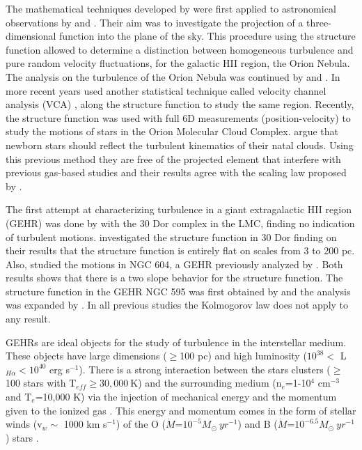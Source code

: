 \documentclass[fleqn,usenatbib]{mnras}
\begin{document}
The mathematical techniques developed by \citet{kolm1,heisenberg1951stability} were first applied to astronomical observations by \citet{von1951methode} and \citet{munch1958internal}. Their aim was to investigate the projection of a three-dimensional function into the plane of the sky. This procedure using the structure function allowed to determine a distinction between homogeneous turbulence and pure random velocity fluctuations, for the galactic HII region, the Orion Nebula. The analysis on the turbulence of the Orion Nebula was continued by \citet{castaneda1988} and \citet{1992ApJ...387..229O}. In more recent years \cite{arthur2016turbulence} used another statistical technique called velocity channel analysis (VCA) \citep{2000ApJ...537..720L}, along the structure function to study the same region. Recently, the structure function was used with full 6D measurements (position-velocity) to study the motions of stars in the Orion Molecular Cloud Complex. \cite{2021ApJ...907L..40H} argue that newborn stars should reflect the turbulent kinematics of their natal clouds. Using this previous method they are free of the projected element that interfere with previous gas-based studies and their results agree with the scaling law proposed by \cite{1981MNRAS.194..809L}.  

The first attempt at characterizing turbulence in a giant extragalactic HII region (GEHR) was done by \citet{1961MNRAS.122....1F} with the 30 Dor complex in the LMC, finding no indication of turbulent motions. \cite{2019arXiv191203543M} investigated the structure function in 30 Dor finding on their results that the structure function is entirely flat on scales from 3 to 200 pc. Also, \cite{2019arXiv191203543M} studied the motions in NGC 604, a GEHR previously analyzed by \cite{tanco1997}. Both results shows that there is a two slope behavior for the structure function. The structure function in the GEHR NGC 595 was first obtained by \cite{lagrois2009multi} and the analysis was expanded by \cite{lagrois2011}. In all previous studies the Kolmogorov law does not apply to any result.

GEHRs are ideal objects for the study of turbulence in the interstellar medium. These objects have large dimensions ($ \geq $100 pc) and high luminosity ($10^{38}<$ L$_{H\alpha}<10^{40}$ erg s$^{-1}$). There is a strong interaction between the stars clusters ($\geq$100 stars with T$_{eff}\geq30,000\ $K) and the surrounding medium (n$_{e}$=1-10$^4$ cm$^{-3}$ and T$_{e}$=10,000 K) via the injection of mechanical energy and the momentum given to the ionized gas \citep{castaneda1992density}. This energy and momentum comes in the form of stellar winds (v$_{w}\sim$ 1000 km s$^{-1}$) of the O ($\dot{M}$=$10^{-5} M_{\odot}\ yr^{-1}$) and B ($\dot{M}$=$10^{-6.5} M_{\odot}\ yr^{-1}$) stars \citep{dyson1979}.
\end{document}
